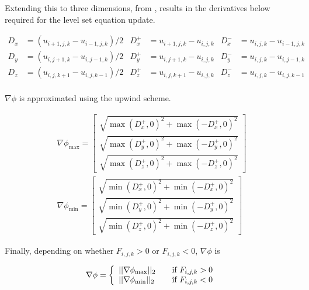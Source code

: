 Extending this to three dimensions, from \cite{Lefohn04astreaming}, results in the derivatives below required for the level set equation update. 

\begin{spacing}{1.1}
\begin{align}
	D_x &= (u_{i+1,j,k}-u_{i-1,j,k})/2 & D_x^+ &= u_{i+1,j,k}-u_{i,j,k} & D_x^- &= u_{i,j,k}-u_{i-1,j,k} \nonumber\\
	D_y &= (u_{i,j+1,k}-u_{i,j-1,k})/2 & D_y^+ &= u_{i,j+1,k}-u_{i,j,k} &	D_y^- &= u_{i,j,k}-u_{i,j-1,k} \nonumber\\
	D_z &= (u_{i,j,k+1}-u_{i,j,k-1})/2 & D_z^+ &= u_{i,j,k+1}-u_{i,j,k} &	D_z^- &= u_{i,j,k}-u_{i,j,k-1} \nonumber\\
	\label{firstorderderivatives}
\end{align}


$\nabla\phi$ is approximated using the upwind scheme.
\end{spacing}

\begin{align}
\nabla\phi_{\max} = \left[
  \begin{array}{ c }
     \sqrt{\max(D_x^+, 0)^2 + \max(-D_x^+,0)^2}  \\[2em]
     \sqrt{\max(D_y^+, 0)^2 + \max(-D_y^+,0)^2}  \\[2em]
     \sqrt{\max(D_z^+, 0)^2 + \max(-D_z^+,0)^2}  
  \end{array} \right]
\\[2em]
\nabla\phi_{\min} = \left[
  \begin{array}{ c }
     \sqrt{\min(D_x^+, 0)^2 + \min(-D_x^+,0)^2}  \\[2em]
     \sqrt{\min(D_y^+, 0)^2 + \min(-D_y^+,0)^2}  \\[2em]
     \sqrt{\min(D_z^+, 0)^2 + \min(-D_z^+,0)^2} 
  \end{array} \right]
\end{align}

Finally, depending on whether $F_{i,j,k} > 0$ or $F_{i,j,k} < 0$, $\nabla\phi$ is 

\begin{equation}
\nabla\phi = \left\{ 
\begin{array}{l l}
  ||\nabla\phi_{\max}||_2 & \quad \mbox{if $F_{i,j,k} > 0$}\\
  ||\nabla\phi_{\min}||_2 & \quad \mbox{if $F_{i,j,k} < 0$}\\ \end{array} \right.
\label{eq:finalchoice}
\end{equation}

